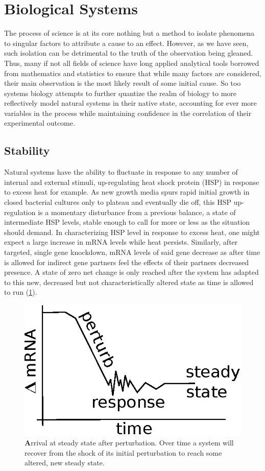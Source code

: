 

\section{Biological Systems}
\label{sec:biosys}
The process of science is at its core nothing but a method to isolate phenomena to singular factors to attribute a cause to an effect. However, as we have seen, such isolation can be detrimental to the truth of the observation being gleaned. Thus, many if not all fields of science have long applied analytical tools borrowed from mathematics and statistics to ensure that while many factors are considered, their main observation is the most likely result of some initial cause. So too systems biology attempts to further quantize the realm of biology to more reflectively model natural systems in their native state, accounting for ever more variables in the process while maintaining confidence in the correlation of their experimental outcome.

\subsection{Stability}
\label{sec:stab}
Natural systems have the ability to fluctuate in response to any number of internal and external stimuli, up-regulating heat shock protein (HSP) in response to excess heat for example. As new growth media spurs rapid initial growth in closed bacterial cultures only to plateau and eventually die off, this HSP up-regulation is a momentary disturbance from a previous balance, a state of intermediate HSP levels, stable enough to call for more or less as the situation should demand. In characterizing HSP level in response to excess heat, one might expect a large increase in mRNA levels while heat persists. Similarly, after targeted, single gene knockdown, mRNA levels of said gene decrease as after time is allowed for indirect gene partners feel the effects of their partners decreased presence. A state of zero net change is only reached after the system has adapted to this new, decreased but not characteristically altered state as time is allowed to run (\cref{fig:SS}).

\begin{figure}[H]
\centering
\includegraphics[width=.5\linewidth]{4/pert.eps}
\caption{{\textbf Arrival at steady state after perturbation.} Over time a system will recover from the shock of its initial perturbation to reach some altered, new steady state.
}
\label{fig:SS}
\end{figure}

